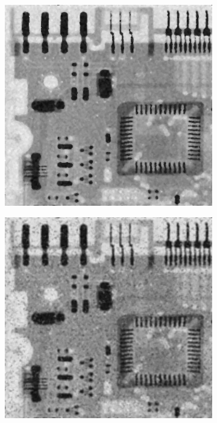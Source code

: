 \begin{figure}[h]
\begin{subfigure}[b]{0.4\linewidth}
		\caption{}
		\label{fig:5-12d}
	\end{subfigure}
	\begin{subfigure}[b]{0.4\linewidth}
		\includegraphics[width=\linewidth]{myfigure/p4/42-unipepsalt-median.png}
		\caption{}
		\label{fig:5-12e}
	\end{subfigure}
	\begin{subfigure}[b]{0.4\linewidth}
		\includegraphics[width=\linewidth]{myfigure/p4/42-unipepsalt-alpha.png}

\end{subfigure}
\end{figure}
